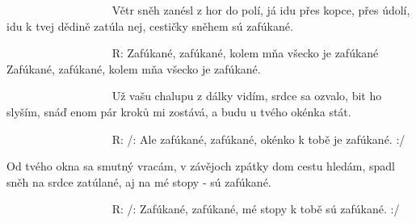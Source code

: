 \resetVars
{}
\MakeHeader
\Lyrics

~~~~~~~~~~~~~~~~~~
Větr sněh zanésl z hor do polí,
já idu přes kopce, přes údolí,
idu k tvej dědině zatúla nej,
cestičky sněhem sú zafúkané.

~~~~~~~~~~~~~~~~~~
R: Zafúkané, zafúkané,
kolem mňa všecko je zafúkané
Zafúkané, zafúkané,
kolem mňa všecko je zafúkané.

~~~~~~~~~~~~~~~~~~
Už vašu chalupu z dálky vidím,
srdce sa ozvalo, bit ho slyším,
snáď enom pár kroků mi zostává,
a budu u tvého okénka stát.

~~~~~~~~~~~~~~~~~~
R: /: Ale zafúkané, zafúkané,
okénko k tobě je zafúkané. :/

Od tvého okna sa smutný vracám,
v závějoch zpátky dom cestu hledám,
spadl sněh na srdce zatúlané,
aj na mé stopy - sú zafúkané.

~~~~~~~~~~~~~~~~~~
R: /: Zafúkané, zafúkané,
mé stopy k tobě sú zafúkané. :/

~~~~~~~~~~~~~~~~~~~~~~~~

\Next
